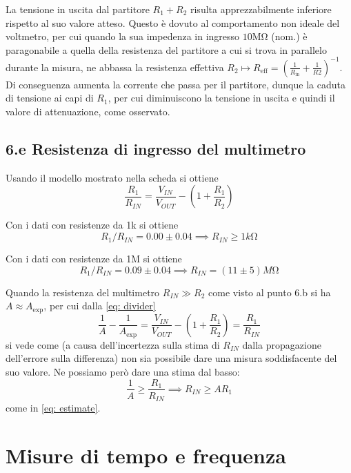 \documentclass[10pt,a4paper]{article}
\begin{document}
La tensione in uscita dal partitore $R_1 + R_2$ risulta apprezzabilmente
inferiore rispetto al suo valore atteso. Questo è dovuto al comportamento
non ideale del voltmetro, per cui quando la sua impedenza in ingresso
$10 \si{\Mohm}$ (nom.) è paragonabile a quella della resistenza del partitore
a cui si trova in parallelo durante la misura, ne abbassa la resistenza
effettiva $R_2 \mapsto R_{\mathrm{eff}} = (\frac{1}{R_{\mathrm{in}}}
+ \frac{1}{R2})^{-1}$. Di conseguenza aumenta la corrente che passa per
il partitore, dunque la caduta di tensione ai capi di $R_1$, per cui
diminuiscono la tensione in uscita e quindi il valore di attenuazione, come
osservato.


\subsection*{6.e Resistenza di ingresso del multimetro}
Usando il modello mostrato nella scheda si ottiene
\begin{equation}\label{eq: divider}
\frac{R_1}{R_{IN}} =  \frac{V_{IN}}{V_{OUT}} - (1 +  \frac{R_1}{R_2} )
\end{equation}

Con i dati con resistenze da 1k si ottiene
\begin{equation}\label{eq: estimate}
R_1/R_{IN} = 0.00  \pm  0.04   \implies  R_{IN} \geq 1 \si{k\ohm}
\end{equation}


Con i dati con resistenze da 1M si ottiene
\[ R_1/R_{IN} = 0.09  \pm  0.04   \implies  R_{IN} = (11 \pm  5) \si{M\ohm}
\]

Quando la resistenza del multimetro $R_{IN} \gg R_2$ come visto al punto
6.b si ha $A \approx A_{\exp}$, per cui dalla \eqref{eq: divider}
\[
\frac{1}{A} - \frac{1}{A_{\exp}} = \frac{V_{IN}}{V_{OUT}} -
(1 +  \frac{R_1}{R_2}) = \frac{R_1}{R_{IN}}
\]
si vede come (a causa dell'incertezza sulla stima di $R_{IN}$ dalla
propagazione dell'errore sulla differenza) non sia possibile dare una misura
soddisfacente del suo valore. Ne possiamo però dare una stima dal basso:
\[
\frac{1}{A} \geq \frac{R_1}{R_{IN}} \implies R_{IN} \geq A R_1
\]
come in \eqref{eq: estimate}.

\section{Misure di tempo e frequenza}
\end{document}
